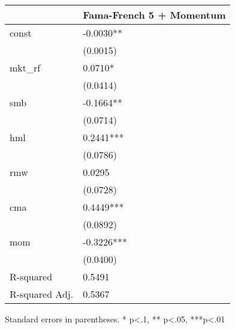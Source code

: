 \begin{table}
\caption{}
\label{}
\begin{center}
\begin{tabular}{ll}
\hline
               & Fama-French 5 + Momentum  \\
\hline
const          & -0.0030**                 \\
               & (0.0015)                  \\
mkt\_rf        & 0.0710*                   \\
               & (0.0414)                  \\
smb            & -0.1664**                 \\
               & (0.0714)                  \\
hml            & 0.2441***                 \\
               & (0.0786)                  \\
rmw            & 0.0295                    \\
               & (0.0728)                  \\
cma            & 0.4449***                 \\
               & (0.0892)                  \\
mom            & -0.3226***                \\
               & (0.0400)                  \\
R-squared      & 0.5491                    \\
R-squared Adj. & 0.5367                    \\
\hline
\end{tabular}
\end{center}
\end{table}
\bigskip
Standard errors in parentheses. \newline 
* p<.1, ** p<.05, ***p<.01